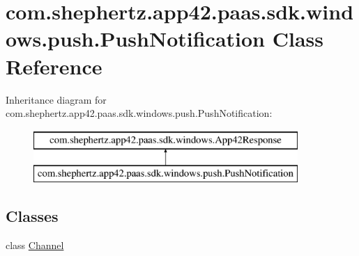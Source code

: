 \hypertarget{classcom_1_1shephertz_1_1app42_1_1paas_1_1sdk_1_1windows_1_1push_1_1_push_notification}{\section{com.\+shephertz.\+app42.\+paas.\+sdk.\+windows.\+push.\+Push\+Notification Class Reference}
\label{classcom_1_1shephertz_1_1app42_1_1paas_1_1sdk_1_1windows_1_1push_1_1_push_notification}
}
Inheritance diagram for com.\+shephertz.\+app42.\+paas.\+sdk.\+windows.\+push.\+Push\+Notification\+:\begin{figure}[H]
\begin{center}
\leavevmode
\includegraphics[height=2.000000cm]{classcom_1_1shephertz_1_1app42_1_1paas_1_1sdk_1_1windows_1_1push_1_1_push_notification}
\end{center}
\end{figure}
\subsection*{Classes}
\begin{DoxyCompactItemize}
\item 
class \hyperlink{classcom_1_1shephertz_1_1app42_1_1paas_1_1sdk_1_1windows_1_1push_1_1_push_notification_1_1_channel}{Channel}
\end{DoxyCompactItemize}
